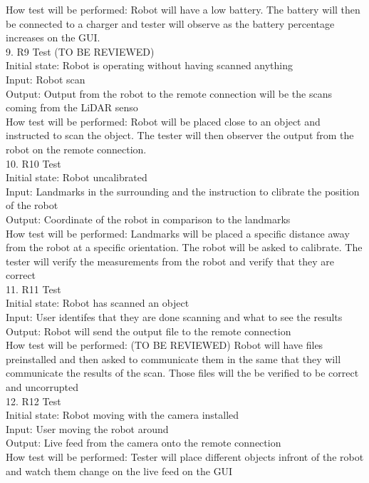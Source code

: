 \documentclass[12pt, titlepage]{article}
\begin{document}
\begin{enumerate}
How test will be performed: Robot will have a low battery. The battery will then be connected to a charger and tester will observe as the battery percentage increases on the GUI.\\
9.	R9 Test (TO BE REVIEWED)\\
Initial state: Robot is operating without having scanned anything \\
Input: Robot scan\\
Output: Output from the robot to the remote connection will be the scans coming from the LiDAR senso\\
How test will be performed: Robot will be placed close to an object and instructed to scan the object. The tester will then observer the output from the robot on the remote connection. \\
10.	R10 Test \\
Initial state: Robot uncalibrated \\
Input: Landmarks in the surrounding and the instruction to clibrate the position of the robot \\
Output: Coordinate of the robot in comparison to the landmarks\\
How test will be performed: Landmarks will be placed a specific distance away from the robot at a specific orientation. The robot will be asked to calibrate. The tester will verify the measurements from the robot and verify that they are correct \\
11.	R11 Test \\
Initial state: Robot has scanned an object \\
Input: User identifes that they are done scanning and what to see the results \\
Output: Robot will send the output file to the remote connection  \\
How test will be performed: (TO BE REVIEWED) Robot will have files preinstalled and then asked to communicate them in the same that they will communicate the results of the scan. Those files will the be verified to be correct and uncorrupted \\
12.	R12 Test \\
Initial state: Robot moving with the camera installed \\
Input: User moving the robot around \\
Output: Live feed from the camera onto the remote connection \\
How test will be performed: Tester will place different objects infront of the robot and watch them change on the live feed on the GUI\\

\end{enumerate}
\end{document}
